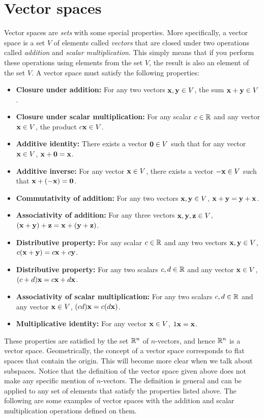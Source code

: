 \section{Vector spaces}
Vector spaces are \textit{sets} with some special properties. More specifically, a vector space is a set $V$ of elements called \textit{vectors} that are closed under two operations called \textit{addition} and \textit{scalar multiplication}. This simply means that if you perform these operations using elements from the set $V$, the result is also an element of the set $V$. A vector space must satisfy the following properties:
\begin{itemize}
    \item \textbf{Closure under addition:} For any two vectors $\mathbf{x}, \mathbf{y} \in V$, the sum $\mathbf{x} + \mathbf{y} \in V$.
    \item \textbf{Closure under scalar multiplication:} For any scalar $c \in \mathbb{R}$ and any vector $\mathbf{x} \in V$, the product $c\mathbf{x} \in V$.
    \item \textbf{Additive identity:} There exists a vector $\mathbf{0} \in V$ such that for any vector $\mathbf{x} \in V$, $\mathbf{x} + \mathbf{0} = \mathbf{x}$.
    \item \textbf{Additive inverse:} For any vector $\mathbf{x} \in V$, there exists a vector $-\mathbf{x} \in V$ such that $\mathbf{x} + (-\mathbf{x}) = \mathbf{0}$.
    \item \textbf{Commutativity of addition:} For any two vectors $\mathbf{x}, \mathbf{y} \in V$, $\mathbf{x} + \mathbf{y} = \mathbf{y} + \mathbf{x}$.
    \item \textbf{Associativity of addition:} For any three vectors $\mathbf{x}, \mathbf{y}, \mathbf{z} \in V$, $(\mathbf{x} + \mathbf{y}) + \mathbf{z} = \mathbf{x} + (\mathbf{y} + \mathbf{z})$.
    \item \textbf{Distributive property:} For any scalar $c \in \mathbb{R}$ and any two vectors $\mathbf{x}, \mathbf{y} \in V$, $c(\mathbf{x} + \mathbf{y}) = c\mathbf{x} + c\mathbf{y}$.
    \item \textbf{Distributive property:} For any two scalars $c, d \in \mathbb{R}$ and any vector $\mathbf{x} \in V$, $(c + d)\mathbf{x} = c\mathbf{x} + d\mathbf{x}$.
    \item \textbf{Associativity of scalar multiplication:} For any two scalars $c, d \in \mathbb{R}$ and any vector $\mathbf{x} \in V$, $(cd)\mathbf{x} = c(d\mathbf{x})$.
    \item \textbf{Multiplicative identity:} For any vector $\mathbf{x} \in V$, $1\mathbf{x} = \mathbf{x}$.
\end{itemize}
These properties are satisfied by the set $\mathbb{R}^n$ of $n$-vectors, and hence $\mathbb{R}^n$ is a vector space. Geometrically, the concept of a vector space corresponds to flat spaces that contain the origin. This will become more clear when we talk about subspaces. Notice that the definition of the vector space given above does not make any specific mention of $n$-vectors. The definition is general and can be applied to any set of elements that satisfy the properties listed above. The following are some examples of vector spaces with the addition and scalar multiplication operations defined on them.

